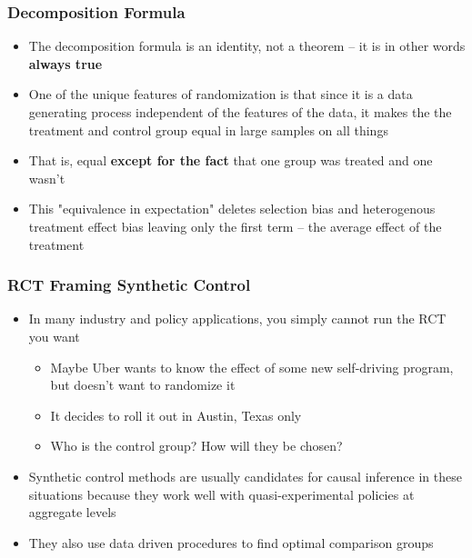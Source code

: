 \documentclass{beamer}
\begin{document}
\begin{frame}
\frametitle{Decomposition Formula}

\begin{itemize}
\item The decomposition formula is an identity, not a theorem -- it is in other words \textbf{always true}
\item One of the unique features of randomization is that since it is a data generating process independent of the features of the data, it makes the the treatment and control group equal in large samples on all things
\item That is, equal \textbf{except for the fact} that one group was treated and one wasn't
\item This "equivalence in expectation" deletes selection bias and heterogenous treatment effect bias leaving only the first term -- the average effect of the treatment
\end{itemize}

\end{frame}

\begin{frame}
\frametitle{RCT Framing Synthetic Control}
\begin{itemize}
\item In many industry and policy applications, you simply cannot run the RCT you want
	\begin{itemize}
	\item Maybe Uber wants to know the effect of some new self-driving program, but doesn't want to randomize it
	\item It decides to roll it out in Austin, Texas only
	\item Who is the control group?  How will they be chosen?
	\end{itemize}
  \item Synthetic control methods are usually candidates for causal inference in these situations because they work well with quasi-experimental policies at aggregate levels
  \item They also use data driven procedures to find optimal comparison groups
\end{itemize}
\end{frame}
\end{document}
